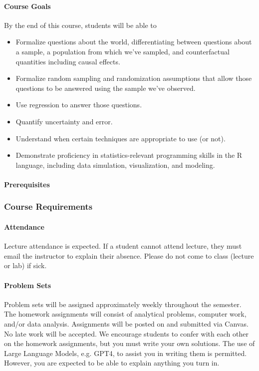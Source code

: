 \documentclass[12pt]{article}
\begin{document}
	
\bigskip


\paragraph{Course Goals} By the end of this course, students will be able to 


\begin{itemize}
\item Formalize questions about the world, differentiating between questions about a sample, a population from which we've sampled, and counterfactual quantities including causal effects.
\item Formalize random sampling and randomization assumptions that allow those questions to be answered using the sample we've observed.
\item Use regression to answer those questions.
\item Quantify uncertainty and error.
\item Understand when certain techniques are appropriate to use (or not).
\item Demonstrate proficiency in statistics-relevant programming skills in the R language, including data simulation, visualization, and modeling.
\end{itemize}

\paragraph{Prerequisites}


\subsubsection*{Course Requirements} 
			\paragraph{Attendance} Lecture attendance is expected. If a student cannot attend lecture, they must email the instructor to explain their absence. Please do not come to class (lecture or lab) if sick. 
			
			\paragraph{Problem Sets} Problem sets will be assigned approximately weekly throughout the semester. The homework assignments will consist of analytical problems, computer work, and/or data analysis.
			Assignments will be posted on and submitted via Canvas. No late work will be accepted. We encourage students to confer with each other on the homework assignments, but you must write your own solutions.
			The use of Large Language Models, e.g. GPT4, to assist you in writing them is permitted. However, you are expected to be able to explain anything you turn in. 
			
\end{document}
